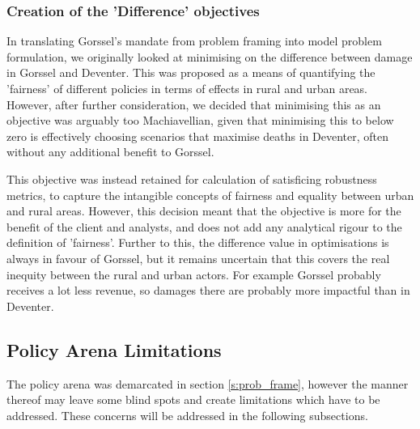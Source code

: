 \subsubsection{Creation of the 'Difference' objectives}
In translating Gorssel's mandate from problem framing into model problem formulation, we originally looked at minimising on the difference between damage in Gorssel and Deventer. This was proposed as a means of quantifying the 'fairness' of different policies in terms of effects in rural and urban areas. However, after further consideration, we decided that minimising this as an objective was arguably too Machiavellian, given that minimising this to below zero is effectively choosing scenarios that maximise deaths in Deventer, often without any additional benefit to Gorssel.

This objective was instead retained for calculation of satisficing robustness metrics, to capture the intangible concepts of fairness and equality between urban and rural areas. However, this decision meant that the objective is more for the benefit of the client and analysts, and does not add any analytical rigour to the definition of 'fairness'. Further to this, the difference value in optimisations is always in favour of Gorssel, but it remains uncertain that this covers the real inequity between the rural and urban actors. For example Gorssel probably receives a lot less revenue, so damages there are probably more impactful than in Deventer.


\subsection{Policy Arena Limitations}

The policy arena was demarcated in section \ref{s:prob_frame}, however the manner thereof may leave some blind spots and create limitations which have to be addressed. These concerns will be addressed in the following subsections.  

